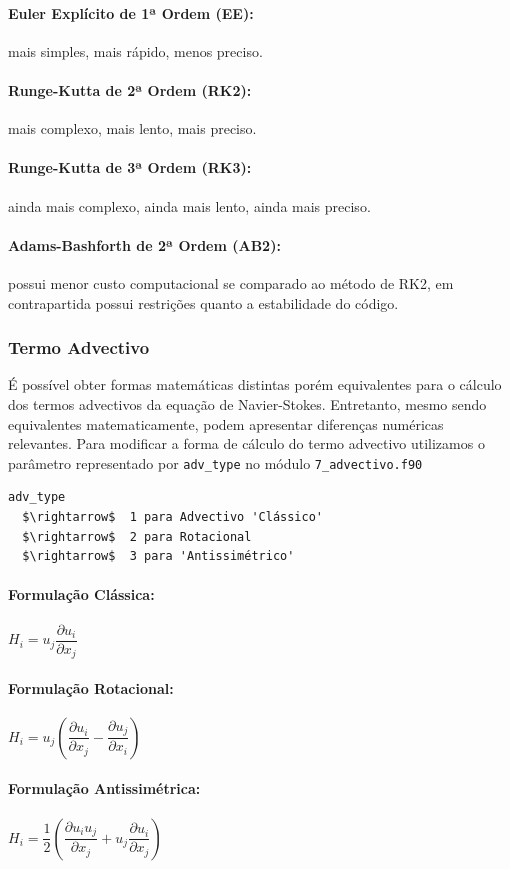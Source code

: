 \documentclass[12pt, a4paper]{article}
\begin{document}
\paragraph{Euler Explícito de 1ª Ordem (EE):} mais simples, mais rápido, menos preciso.
\paragraph{Runge-Kutta de 2ª Ordem (RK2):} mais complexo, mais lento, mais preciso.
\paragraph{Runge-Kutta de 3ª Ordem (RK3):} ainda mais complexo, ainda mais lento, ainda mais preciso.
\paragraph{Adams-Bashforth de 2ª Ordem (AB2):} possui menor custo computacional se comparado ao método de RK2, em contrapartida possui restrições quanto a estabilidade do código.

\subsubsection{Termo Advectivo}

É possível obter formas matemáticas distintas porém equivalentes para o cálculo dos termos advectivos da equação de Navier-Stokes. Entretanto, mesmo sendo equivalentes matematicamente, podem apresentar diferenças numéricas relevantes. Para modificar a forma de cálculo do termo advectivo utilizamos o parâmetro representado por \verb|adv_type| no módulo \verb|7_advectivo.f90|
\begin{lstlisting}[escapeinside='']
adv_type  
  $\rightarrow$  1 para Advectivo 'Clássico'
  $\rightarrow$  2 para Rotacional
  $\rightarrow$  3 para 'Antissimétrico'
\end{lstlisting}

\paragraph{Formulação Clássica:} $H_i = u_j  \dfrac{\partial u_i}{\partial x_j}$
\paragraph{Formulação Rotacional:} $H_i = u_j \left(\dfrac{\partial u_i}{\partial x_j} - \dfrac{\partial u_j}{\partial x_i}\right)$
\paragraph{Formulação Antissimétrica:} $H_i = \dfrac{1}{2} \left(\dfrac{\partial u_i u_j}{\partial x_j} + u_j\dfrac{\partial u_i}{\partial x_j}\right)$
\end{document}
